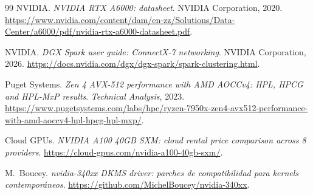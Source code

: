 \documentclass[a4paper,11pt]{article}
\begin{document}
\begin{thebibliography}{99}
NVIDIA.
\newblock \emph{NVIDIA RTX A6000: datasheet}.
\newblock NVIDIA Corporation, 2020.
\newblock \url{https://www.nvidia.com/content/dam/en-zz/Solutions/Data-Center/a6000/pdf/nvidia-rtx-a6000-datasheet.pdf}.

NVIDIA.
\newblock \emph{DGX Spark user guide: ConnectX-7 networking}.
\newblock NVIDIA Corporation, 2026.
\newblock \url{https://docs.nvidia.com/dgx/dgx-spark/spark-clustering.html}.

Puget Systems.
\newblock \emph{Zen 4 AVX-512 performance with AMD AOCCv4: HPL, HPCG and HPL-MxP results}.
\newblock \emph{Technical Analysis}, 2023.
\newblock \url{https://www.pugetsystems.com/labs/hpc/ryzen-7950x-zen4-avx512-performance-with-amd-aoccv4-hpl-hpcg-hpl-mxp/}.

Cloud GPUs.
\newblock \emph{NVIDIA A100 40GB SXM: cloud rental price comparison across 8 providers}.
\newblock \url{https://cloud-gpus.com/nvidia-a100-40gb-sxm/}.

M.~Boucey.
\newblock \emph{nvidia-340xx DKMS driver: parches de compatibilidad para \textit{kernels} contemporáneos}.
\newblock \url{https://github.com/MichelBoucey/nvidia-340xx}.

\end{thebibliography}
\end{document}
